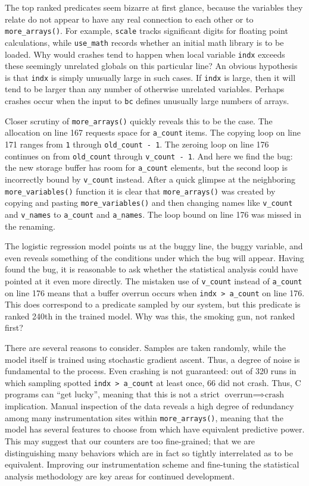 The top ranked predicates seem bizarre at first glance, because the
variables they relate do not appear to have any real connection to
each other or to \texttt{more\_arrays()}.  For example, \texttt{scale}
tracks significant digits for floating point calculations, while
\texttt{use\_math} records whether an initial math library is to be
loaded.  Why would crashes tend to happen when local variable
\texttt{indx} exceeds these seemingly unrelated globals on this
particular line?  An obvious hypothesis is that \texttt{indx} is
simply unusually large in such cases.  If \texttt{indx} is large, then
it will tend to be larger than any number of otherwise unrelated
variables.  Perhaps crashes occur when the input to \texttt{bc}
defines unusually large numbers of arrays.

Closer scrutiny of \texttt{more\_arrays()} quickly reveals this to be
the case.  The allocation on line 167 requests space for
\texttt{a\_count} items.  The copying loop on line 171 ranges from
\texttt{1} through \texttt{old\_count - 1}.  The zeroing loop on line
176 continues on from \texttt{old\_count} through \texttt{v\_count -
  1}.  And here we find the bug: the new storage buffer has room for
\texttt{a\_count} elements, but the second loop is incorrectly bound
by \texttt{v\_count} instead.  After a quick glimpse at the
neighboring \texttt{more\_variables()} function it is clear that
\texttt{more\_arrays()} was created by copying and pasting
\texttt{more\_variables()} and then changing names like
\texttt{v\_count} and \texttt{v\_names} to \texttt{a\_count} and
\texttt{a\_names}.  The loop bound on line 176 was missed in the
renaming.

The logistic regression model points us at the buggy line, the buggy
variable, and even reveals something of the conditions under which the
bug will appear.  Having found the bug, it is reasonable to ask
whether the statistical analysis could have pointed at it even more
directly.  The mistaken use of \texttt{v\_count} instead of
\texttt{a\_count} on line 176 means that a buffer overrun occurs when
\texttt{indx > a\_count} on line 176.  This does correspond to a
predicate sampled by our system, but this predicate is ranked 240th in
the trained model.  Why was this, the smoking gun, not ranked first?

There are several reasons to consider.  Samples are taken randomly,
while the model itself is trained using stochastic gradient ascent.
Thus, a degree of noise is fundamental to the process.  Even crashing
is not guaranteed: out of 320 runs in which sampling spotted
\texttt{indx > a\_count} at least once, 66 did not crash.  Thus, C
programs can ``get lucky'', meaning that this is not a strict
$\text{overrun} \implies \text{crash}$ implication.  Manual inspection
of the data reveals a high degree of redundancy among many
instrumentation sites within \texttt{more\_arrays()}, meaning that the
model has several features to choose from which have equivalent
predictive power.  This may suggest that our counters are too
fine-grained; that we are distinguishing many behaviors which are in
fact so tightly interrelated as to be equivalent.  Improving our
instrumentation scheme and fine-tuning the statistical analysis
methodology are key areas for continued development.

